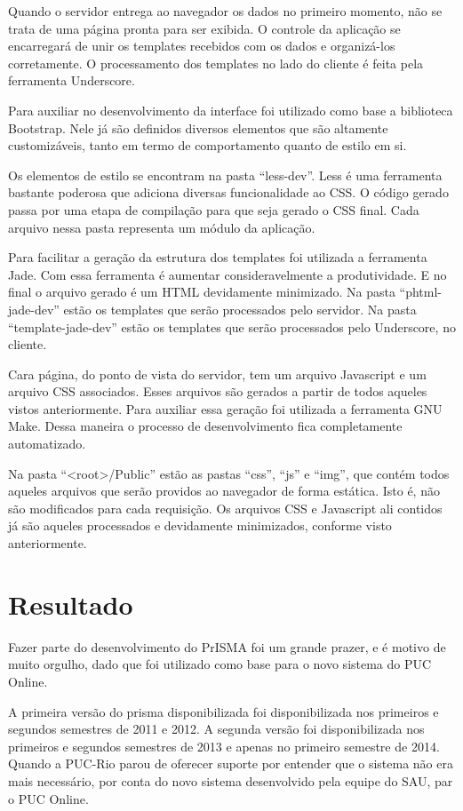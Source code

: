 \documentclass[graduacao,brazil]{ThesisPUC}
\begin{document}
Quando o servidor entrega ao navegador os dados no primeiro momento, não se trata de uma página pronta para ser exibida. O controle da aplicação se encarregará de unir os templates recebidos com os dados e organizá-los corretamente. O processamento dos templates no lado do cliente é feita pela ferramenta Underscore.

Para auxiliar no desenvolvimento da interface foi utilizado como base a biblioteca Bootstrap. Nele já são definidos diversos elementos que são altamente customizáveis, tanto em termo de comportamento quanto de estilo em si.

Os elementos de estilo se encontram na pasta “less-dev”. Less é uma ferramenta bastante poderosa que adiciona diversas funcionalidade ao CSS. O código gerado passa por uma etapa de compilação para que seja gerado o CSS final. Cada arquivo nessa pasta representa um módulo da aplicação.

Para facilitar a geração da estrutura dos templates foi utilizada a ferramenta Jade. Com essa ferramenta é aumentar consideravelmente a produtividade. E no final o arquivo gerado é um HTML devidamente minimizado. Na pasta “phtml-jade-dev” estão os templates que serão processados pelo servidor. Na pasta “template-jade-dev” estão os templates que serão processados pelo Underscore, no cliente.

Cara página, do ponto de vista do servidor, tem um arquivo Javascript e um arquivo CSS associados. Esses arquivos são gerados a partir de todos aqueles vistos anteriormente. Para auxiliar essa geração foi utilizada a ferramenta GNU Make. Dessa maneira o processo de desenvolvimento fica completamente automatizado.

Na pasta “<root>/Public” estão as pastas “css”, “js” e “img”, que contém todos aqueles arquivos que serão providos ao navegador de forma estática. Isto é, não são modificados para cada requisição. Os arquivos CSS e Javascript ali contidos já são aqueles processados e devidamente minimizados, conforme visto anteriormente.

\chapter{Resultado}

Fazer parte do desenvolvimento do PrISMA foi um grande prazer, e é motivo de muito orgulho, dado que foi utilizado como base para o novo sistema do PUC Online.

A primeira versão do prisma disponibilizada foi disponibilizada nos primeiros e segundos semestres de 2011 e 2012. A segunda versão foi disponibilizada nos primeiros e segundos semestres de 2013 e apenas no primeiro semestre de 2014. Quando a PUC-Rio parou de oferecer suporte por entender que o sistema não era mais necessário, por conta do novo sistema desenvolvido pela equipe do SAU, par o PUC Online.
\end{document}
